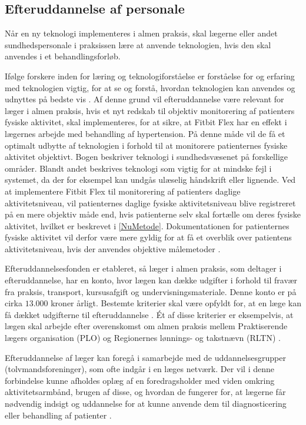 \subsection{Efteruddannelse af personale}
\label{sec:efteruddannelse}
Når en ny teknologi implementeres i almen praksis, skal lægerne eller andet sundhedspersonale i praksissen lære at anvende teknologien, hvis den skal anvendes i et behandlingsforløb.
 
Ifølge forskere inden for læring og teknologiforståelse er forståelse for og erfaring med teknologien vigtig, for at se og forstå, hvordan teknologien kan anvendes og udnyttes på bedste vis \citep{aarhusuniversitet2013}. 
Af denne grund vil efteruddannelse være relevant for læger i almen praksis, hvis et nyt redskab til objektiv monitorering af patienters fysiske aktivitet, skal implementeres, for at sikre, at Fitbit Flex har en effekt i lægernes arbejde med behandling af hypertension. På denne måde vil de få et optimalt udbytte af teknologien i forhold til at monitorere patienternes fysiske aktivitet objektivt. Bogen  beskriver teknologi i sundhedsvæsenet på forskellige områder. Blandt andet beskrives teknologi som vigtig for at mindske fejl i systemet, da der for eksempel kan undgås ulæselig håndskrift eller lignende. Ved at implementere Fitbit Flex til monitorering af patienters daglige aktivitetsniveau, vil patienternes daglige fysiske aktivitetsniveau blive registreret på en mere objektiv måde end, hvis patienterne selv skal fortælle om deres fysiske aktivitet, hvilket er beskrevet i \autoref{NuMetode}. Dokumentationen for patienternes fysiske aktivitet vil derfor være mere gyldig for at få et overblik over patientens aktivitetsniveau, hvis der anvendes objektive målemetoder \citep{hasse2012}. 

Efteruddannelsesfonden er etableret, så læger i almen praksis, som deltager i efteruddannelse, har en konto, hvor lægen kan dække udgifter i forhold til fravær fra praksis, transport, kursusafgift og undervisningsmateriale. Denne konto er på cirka $13.000$ kroner årligt. Bestemte kriterier skal være opfyldt for, at en læge kan få dækket udgifterne til efteruddannelse \citep{vedsted2005}. Ét af disse kriterier er eksempelvis, at lægen skal arbejde efter overenskomst om almen praksis mellem Praktiserende lægers organisation (PLO) og Regionernes lønnings- og takstnævn (RLTN) \citep{fondenforalmenpraksis2016}. 

Efteruddannelse af læger kan foregå i samarbejde med de uddannelsesgrupper (tolvmandsforeninger), som ofte indgår i en læges netværk. Der vil i denne forbindelse kunne afholdes oplæg af en foredragsholder med viden omkring aktivitetsarmbånd, brugen af disse, og hvordan de fungerer for, at lægerne får nødvendig indsigt og uddannelse for at kunne anvende dem til diagnosticering eller behandling af patienter \citep{vedsted2005}. 

